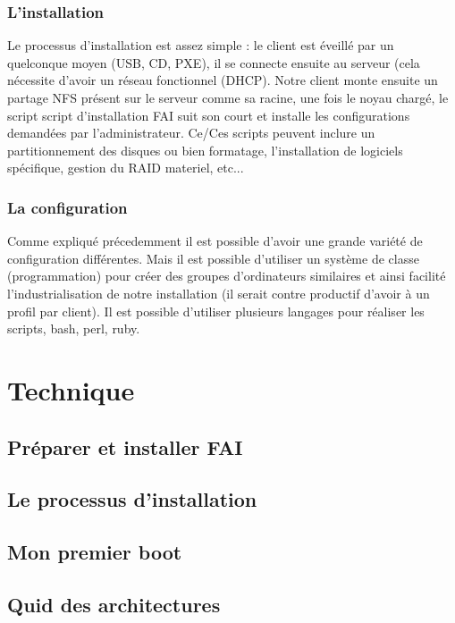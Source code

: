 \documentclass[a4paper,12pt,one side,titlepage]{report}
\begin{document}
\subsection{L'installation}
Le processus d'installation est assez simple : le client est éveillé par un quelconque moyen (USB, CD, PXE), il se connecte ensuite au serveur (cela nécessite d'avoir un réseau fonctionnel (DHCP). Notre client monte ensuite un partage NFS présent sur le serveur comme sa racine, une fois le noyau chargé, le script script d'installation FAI suit son court et installe les configurations demandées par l'administrateur. Ce/Ces scripts peuvent inclure un partitionnement des disques ou bien formatage, l'installation de logiciels spécifique, gestion du RAID materiel, etc...

\subsection{La configuration}
Comme expliqué précedemment il est possible d'avoir une grande variété de configuration différentes. Mais il est possible d'utiliser un système de classe (programmation) pour créer des groupes d'ordinateurs similaires et ainsi facilité l'industrialisation de notre installation (il serait contre productif d'avoir à un profil par client). Il est possible d'utiliser plusieurs langages pour réaliser les scripts, bash, perl, ruby.

\chapter{Technique}

\section{Préparer et installer FAI}

\section{Le processus d'installation}

\section{Mon premier boot}

\section{Quid des architectures}
\end{document}
